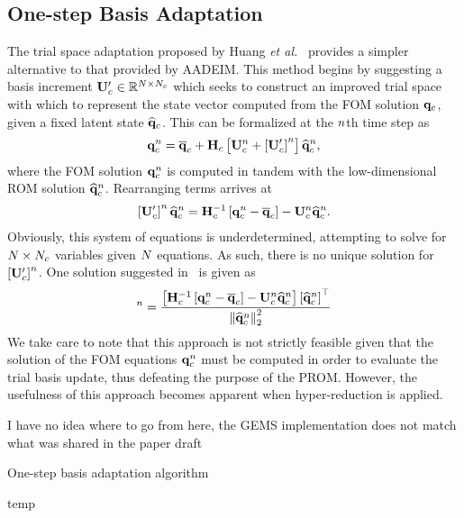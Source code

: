 \subsection{One-step Basis Adaptation}
%
The trial space adaptation proposed by Huang \textit{et al.}~\cite{Huang2022a} provides a simpler alternative to that provided by AADEIM. This method begins by suggesting a basis increment $\consTrialUpdate \inRTwo{\numDOF}{\numConsModes}$ which seeks to construct an improved trial space with which to represent the state vector computed from the FOM solution $\mathbf{q}_{c}$, given a fixed latent state $\mathbf{\widehat{q}}_{c}$. This can be formalized at the $n$th time step as
%
\begin{eqnarray}
	\consVec^{\timeIdx} = \consVecCent + \consScale \left[\consTrial^{\timeIdx} + \left[\consTrialUpdate\right]^{\timeIdx} \right] \consVecCoef^{\timeIdx},
\end{eqnarray}
%
where the FOM solution $\mathbf{q}_{c}^{n}$ is computed in tandem with the low-dimensional ROM solution $\mathbf{\widehat{q}}_{c}^{n}$. Rearranging terms arrives at
%
\begin{eqnarray}
	\left[\consTrialUpdate\right]^{\timeIdx} \consVecCoef^{\timeIdx} = \consScaleInv \left[\consVec^{\timeIdx} - \consVecCent\right] - \consTrial^{\timeIdx} \consVecCoef^{\timeIdx}.
\end{eqnarray}
%
Obviously, this system of equations is underdetermined, attempting to solve for $N \times N_c$ variables given $N$ equations. As such, there is no unique solution for $\left[\consTrialUpdate\right]^{\timeIdx}$. One solution suggested in~\cite{Huang2022a} is given as
%
\begin{equation}
	[\consTrialUpdate]^{\timeIdx} = \frac{\left[\consScaleInv\left[\consVec^{\timeIdx} - \consVecCent\right] - \consTrial^{\timeIdx} \consVecCoef^{\timeIdx}\right]\left[\consVecCoef^{\timeIdx}\right]^\top}{\left\Vert \consVecCoef^{\timeIdx} \right\Vert^2_2}
\end{equation}
%
We take care to note that this approach is not strictly feasible given that the solution of the FOM equations $\mathbf{q}_{c}^{n}$ must be computed in order to evaluate the trial basis update, thus defeating the purpose of the PROM. However, the usefulness of this approach becomes apparent when hyper-reduction is applied.

{\color{red}I have no idea where to go from here, the GEMS implementation does not match what was shared in the paper draft}

\begin{algorithm}
	\caption{One-step basis adaptation algorithm}\label{alg:oneStep}
	\begin{algorithmic}
		\STATE temp
	\end{algorithmic}
\end{algorithm}



